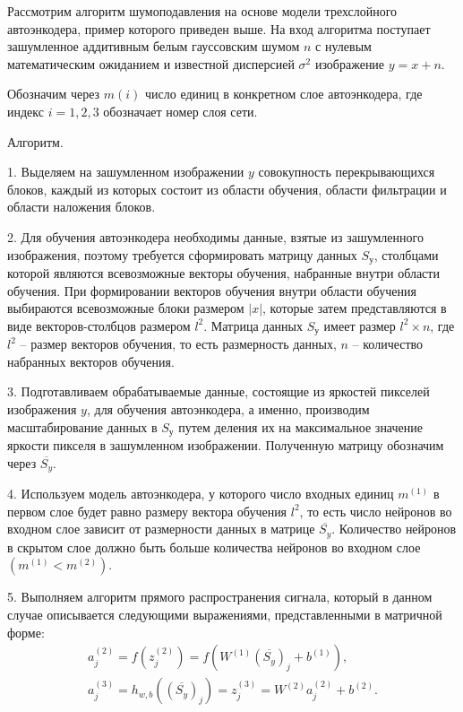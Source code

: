 \documentclass[a4paper,12pt]{article}
\begin{document}
   Рассмотрим алгоритм шумоподавления на основе модели трехслойного автоэнкодера, пример которого приведен выше. На вход алгоритма поступает зашумленное аддитивным белым гауссовским шумом $n$ с нулевым математическим ожиданием и известной дисперсией $\sigma^2$ изображение $y=x+n$. 

Обозначим через $m(i)$ число единиц в конкретном слое автоэнкодера, где индекс $i = 1,2,3$ обозначает номер слоя сети.

Алгоритм.

1. Выделяем на зашумленном изображении $y$ совокупность перекрывающихся блоков, каждый из которых состоит из области обучения, области фильтрации и области наложения блоков.

2. Для обучения автоэнкодера необходимы данные, взятые из зашумленного изображения, поэтому требуется сформировать матрицу данных $S_у$, столбцами которой являются всевозможные векторы обучения, набранные внутри области обучения. При формировании векторов обучения внутри области обучения выбираются всевозможные блоки размером $|x|$, которые затем представляются в виде векторов-столбцов размером $l^2$. Матрица данных $S_у$ имеет размер $l^2 \times n$, где $l^2$ – размер векторов обучения, то есть размерность данных, $n$ – количество набранных векторов обучения.

3. Подготавливаем обрабатываемые данные, состоящие из яркостей пикселей изображения $y$, для обучения автоэнкодера, а именно, производим масштабирование данных в $S_у$ путем деления их на максимальное значение яркости пикселя в зашумленном изображении. Полученную матрицу обозначим через $\overline{S_y}$.

4. Используем модель автоэнкодера, у которого число входных единиц $m^{(1)}$ в первом слое будет равно размеру вектора обучения $l^2$, то есть число нейронов во входном слое зависит от размерности данных в матрице $\overline{S_y}$. Количество нейронов в скрытом слое должно быть больше количества нейронов во входном слое $(m^{(1)} < m^{(2)})$. 

5. Выполняем алгоритм прямого распространения сигнала, который в данном случае описывается следующими выражениями, представленными в матричной форме:
\begin{eqnarray}
a_j^{(2)} = f(z_j^{(2)}) = f(W^{(1)}(\overline{S_y})_j + b^{(1)}),\\
a_j^{(3)} = h_{w,b}((\overline{S_y})_j) = z_j^{(3)} = W^{(2)}a_j^{(2)} + b^{(2)}.
\end{eqnarray}
\end{document}
